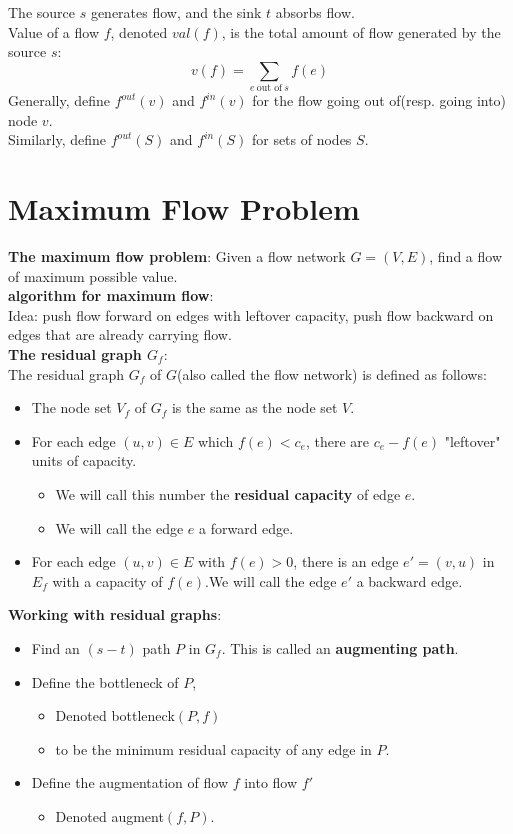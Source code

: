 \documentclass[onecolumn]{report}
\begin{document}
The source $s$ generates flow, and the sink $t$ absorbs flow.\\
Value of a flow $f$, denoted $val(f)$, is the total amount of flow generated by the source $s$:
\begin{equation*}
    v(f)=\sum_{e \: \text{out of}\: s}f(e)
\end{equation*}
Generally, define $f^{out}(v)$ and $f^{in}(v)$ for the flow going out of(resp. going into) node $v$.\\
Similarly, define $f^{out}(S)$ and $f^{in}(S)$ for sets of nodes $S$.\\

\noindent
\section{Maximum Flow Problem}
\textbf{The maximum flow problem}: Given a flow network $G=(V,E)$, find a flow of maximum possible value.\\
\textbf{algorithm for maximum flow}:\\
Idea: push flow forward on edges with leftover capacity, push flow backward on edges that are already carrying flow.\\
\noindent
\textbf{The residual graph $G_f$}:\\
The residual graph $G_f$ of $G$(also called the flow network) is defined as follows:
\begin{itemize}
    \item The node set  $V_f$ of $G_f$ is the same as the node set $V$.
    \item For each edge $(u,v)\in E$ which $f(e) < c_e$, there are $c_e-f(e)$ "leftover" units of capacity.
    \begin{itemize}
        \item We will call this number the \textbf{residual capacity} of edge $e$.
        \item We will call the edge $e$ a forward edge.
    \end{itemize}
    \item For each edge $(u,v)\in E$ with $f(e)>0$, there is an edge $e'= (v,u)$ in $E_f$ with a capacity of $f(e)$.We will call the edge $e'$ a backward edge.
\end{itemize}

\textbf{Working with residual graphs}:
\begin{itemize}
    \item Find an $(s-t)$ path $P$ in $G_f$. This is called an \textbf{augmenting path}.
    \item Define the bottleneck of $P$,
    \begin{itemize}
        \item Denoted bottleneck$(P,f)$
        \item to be the minimum residual capacity of any edge in $P$.
    \end{itemize}
    \item Define the augmentation of flow $f$ into flow $f'$
    \begin{itemize}
        \item Denoted augment$(f,P)$.
    \end{itemize}
\end{itemize}
\end{document}
